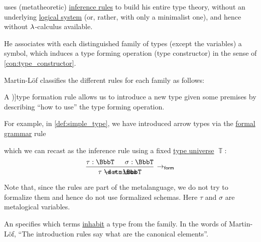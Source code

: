 \begin{remark}\label{rem:type_theory_rule_classification}
   uses (metatheoretic) \hyperref[def:inference_rule]{inference rules} to build his entire type theory, without an underlying \hyperref[con:logical_system]{logical system} (or, rather, with only a minimalist one), and hence without \( {\mathrm \lambda} \)-calculus available.

  He associates with each distinguished family of types (except the variables) a symbol, which induces a type forming operation (type constructor) in the sense of \cref{con:type_constructor}.

  Martin-L\"of classifies the different rules for each family as follows:
  \begin{thmenum}
     A \term[en=formation (rule) (\cite[\S 8.1.9]{Mimram2020ProgramEqualsProof})]{type formation} rule allows us to introduce a new type given some premises by describing \enquote{how to use} the type forming operation.

    For example, in \cref{def:simple_type}, we have introduced arrow types via the \hyperref[def:formal_grammar/schema]{formal grammar} rule
    \begin{bnf*}
       {\bnftsq{(} \bnfsp {} \bnfsp \bnftsq{\( \synimplies \)} \bnfsp {} \bnfsp \bnftsq{)}}
    \end{bnf*}
    which we can recast as the inference rule using a fixed \hyperref[con:type_universe]{type universe} \( \BbbT \):
    \begin{equation*}
      \begin{prooftree}
        \hypo{ \tau: \BbbT }
        \hypo{ \sigma: \BbbT }
        \infer2[\ensuremath{ \rightarrow_{\logic{form}} }]{ \tau \synimplies \sigma: \BbbT }
      \end{prooftree}
    \end{equation*}

    Note that, since the rules are part of the metalanguage, we do not try to formalize them and hence do not use formalized schemas. Here \( \tau \) and \( \sigma \) are metalogical variables.

     An  specifies which terms \hyperref[def:type_habitation]{inhabit} a type from the family. In the words of Martin-L\"of, \enquote{The introduction rules say what are the canonical elements}.


\end{thmenum}
\end{remark}
